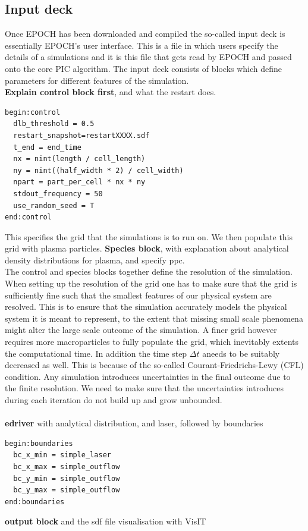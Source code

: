 \documentclass[%
onecolumn, notitlepage,
 amsmath,amssymb,
 aps,
]{article}
\begin{document}
\subsection{Input deck}
Once EPOCH has been downloaded and compiled the so-called input deck is essentially EPOCH's user interface. This is a file in which users specify the details of a simulations and it is this file that gets read by EPOCH and passed onto the core PIC algorithm. The input deck consists of blocks which define parameters for different features of the simulation. \\
\textbf{Explain control block first}, and what the restart does.
\begin{verbatim}
begin:control
  dlb_threshold = 0.5
  restart_snapshot=restartXXXX.sdf
  t_end = end_time
  nx = nint(length / cell_length)
  ny = nint((half_width * 2) / cell_width)
  npart = part_per_cell * nx * ny
  stdout_frequency = 50
  use_random_seed = T
end:control
\end{verbatim}
This specifies the grid that the simulations is to run on. We then populate this grid with plasma particles.
\textbf{Species block}, with explanation about analytical density distributions for plasma, and specify ppc.\\
The control and species blocks together define the resolution of the simulation. When setting up the resolution of the grid one has to make sure that the grid is sufficiently fine such that the smallest features of our physical system are resolved. This is to ensure that the simulation accurately models the physical system it is meant to represent, to the extent that missing small scale phenomena might alter the large scale outcome of the simulation. A finer grid however requires more macroparticles to fully populate the grid, which inevitably extents the computational time. In addition the time step $\Delta t$ aneeds to be suitably decreased as well. This is because of the so-called Courant-Friedrichs-Lewy (CFL) condition.  Any simulation introduces uncertainties in the final outcome due to the finite resolution. We need to make sure that the uncertainties introduces during each iteration do not build up and grow unbounded. \\
\\
\textbf{edriver} with analytical distribution, and laser, followed by boundaries
\begin{center}
\begin{verbatim}
begin:boundaries
  bc_x_min = simple_laser
  bc_x_max = simple_outflow
  bc_y_min = simple_outflow
  bc_y_max = simple_outflow
end:boundaries
\end{verbatim}
\end{center}
\textbf{output block} and the sdf file visualisation with VisIT








\clearpage
 \vfill
 
 


 
\end{document}
